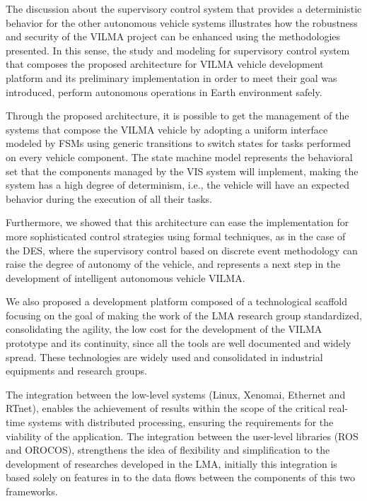 \documentclass[conference]{IEEEtran}
\begin{document}
The discussion about the supervisory control system that provides a deterministic behavior for the other autonomous vehicle systems illustrates how the robustness and security of the VILMA project can be enhanced using the methodologies presented. In this sense, the study and modeling for supervisory control system that composes the proposed architecture for VILMA vehicle development platform and its preliminary implementation in order to meet their goal was introduced, perform autonomous operations in Earth environment safely.

Through the proposed architecture, it is possible to get the management of the systems that compose the VILMA vehicle by adopting a uniform interface modeled by FSMs using generic transitions to switch states for tasks performed on every vehicle component. The state machine model represents the behavioral set that the components managed by the VIS system will implement, making the system has a high degree of determinism, i.e., the vehicle will have an expected behavior during the execution of all their tasks.

Furthermore, we showed that this architecture can ease the implementation for more sophisticated control strategies using formal techniques, as in the case of the DES, where the supervisory control based on discrete event methodology can raise the degree of autonomy of the vehicle, and represents a next step in the development of intelligent autonomous vehicle VILMA.

We also proposed a development platform composed of a technological scaffold focusing on the goal of making the work of the LMA research group standardized, consolidating the agility, the low cost for the development of the VILMA prototype and its continuity, since all the tools are well documented and widely spread. These technologies are widely used and consolidated in industrial equipments and research groups.

The integration between the low-level systems (Linux, Xenomai, Ethernet and RTnet), enables the achievement of results within the scope of the critical real-time systems with distributed processing, ensuring the requirements for the viability of the application. The integration between the user-level libraries (ROS and OROCOS), strengthens the idea of flexibility and simplification to the development of researches developed in the LMA, initially this integration is based solely on features in to the data flows between the components of this two frameworks.
\end{document}
